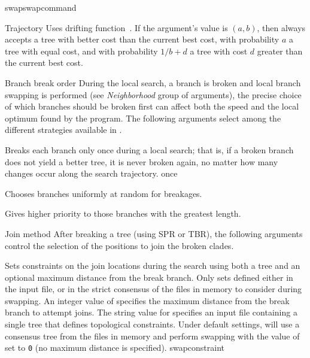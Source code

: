 \begin{command}{swap}{swapcommand}
\begin{arguments}
\begin{argumentgroup}{Trajectory}
            {Uses \poy drifting function~\cite{goloboff1999}. If the argument's value is
            $(a, b)$, then \poy always accepts a tree with better cost than
            the current best cost, with probability $a$ a tree with equal cost,
            and with probability $1 / b + d$ a tree with cost $d$ greater
            than the current best cost.}
            {}

	\end{argumentgroup}

	\begin{argumentgroup}{Branch break order}
		{During the local search, a branch is broken and local branch swapping
		is performed (see \emph{Neighborhood} group of arguments), the
		precise choice of which branches
        should be broken first can affect both the speed and the local
        optimum found by the program. The following arguments select among
        the different strategies available in \poy.}
        
            {Breaks each branch only once during a local search; that is, if a
            broken branch does not yield a better tree, it is never broken again,
            no matter how many changes occur along the search trajectory.}
            {once}

            {Chooses branches uniformly at random for breakages.}
            {}

            {Gives higher priority to those branches with the greatest length.}
            {}

    \end{argumentgroup}

    \begin{argumentgroup}{Join method}
        {After breaking a tree (using SPR or TBR), the following 
        arguments control the selection of the positions to join the broken
        clades.}

                {Sets
                constraints on the join locations during the search using both a tree and an optional maximum distance
                from the break branch. Only sets defined either in the input
                file, or in the strict consensus of the files in memory to consider during swapping. An integer value of
                 specifies the maximum distance from the
                break branch to attempt joins. The string value for
                 specifies an input file containing a single
                tree that defines topological constraints. Under default settings,
                will use a consensus tree from the files in memory and perform
                swapping with the value of  set to \texttt{0}
                (no maximum distance is specified).}
                {swapconstraint}


\end{argumentgroup}
\end{arguments}
\end{command}
